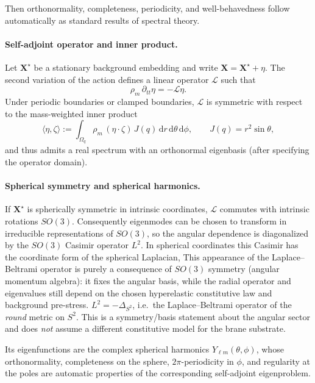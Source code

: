 \documentclass[11pt,a4paper]{article}
\providecommand{\dd}{\mathrm{d}}
\newcommand{\X}{\mathbf{X}}                 %
\begin{document}
Then orthonormality, completeness, periodicity, and well-behavedness follow automatically as standard results
of spectral theory.

\paragraph{Self-adjoint operator and inner product.}
Let \(\X^\star\) be a stationary background embedding and write \(\X=\X^\star+\eta\).
The second variation of the action defines a linear operator \(\mathcal{L}\) such that
\[
\rho_m\,\partial_{tt}\eta=-\mathcal{L}\eta.
\]
Under periodic boundaries or clamped boundaries, \(\mathcal{L}\) is symmetric with respect to the mass-weighted
inner product
\begin{equation}
\langle \eta,\zeta\rangle :=\int_{\Omega_q}\rho_m\,(\eta\cdot\zeta)\,J(q)\,\dd r\,\dd\theta\,\dd\phi,
\qquad
J(q)=r^2\sin\theta,
\label{eq:inner_product_mass}
\end{equation}
and thus admits a real spectrum with an orthonormal eigenbasis (after specifying the operator domain).

\paragraph{Spherical symmetry and spherical harmonics.}
If \(\X^\star\) is spherically symmetric in intrinsic coordinates, \(\mathcal{L}\) commutes with intrinsic
rotations \(SO(3)\). Consequently eigenmodes can be chosen to transform in irreducible representations of \(SO(3)\),
so the angular dependence is diagonalized by the \(SO(3)\) Casimir operator \(L^2\).
In spherical coordinates this Casimir has the coordinate form of the spherical Laplacian,
This appearance of the Laplace--Beltrami operator is purely a consequence of $SO(3)$ symmetry (angular momentum algebra): it fixes the angular basis, while the radial operator and eigenvalues still depend on the chosen hyperelastic constitutive law and background pre-stress.
\(L^2=-\Delta_{S^2}\), i.e.\ the Laplace--Beltrami operator of the \emph{round} metric on \(S^2\).
This is a symmetry/basis statement about the angular sector and does \emph{not} assume a different
constitutive model for the brane substrate.

Its eigenfunctions are the complex spherical harmonics \(Y_{\ell m}(\theta,\phi)\), whose orthonormality,
completeness on the sphere, \(2\pi\)-periodicity in \(\phi\), and regularity at the poles are automatic
properties of the corresponding self-adjoint eigenproblem.
\end{document}
